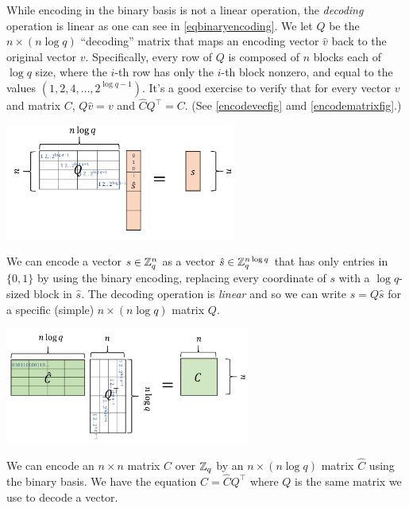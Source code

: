 While encoding in the binary basis is not a linear operation, the
\emph{decoding} operation is linear as one can see in
\eqref{eqbinaryencoding}. We let \(Q\) be the \(n \times (n\log q)\)
``decoding'' matrix that maps an encoding vector \(\hat{v}\) back to the
original vector \(v\). Specifically, every row of \(Q\) is composed of
\(n\) blocks each of \(\log q\) size, where the \(i\)-th row has only
the \(i\)-th block nonzero, and equal to the values
\((1,2,4,\ldots,2^{\log q-1})\). It's a good exercise to verify that for
every vector \(v\) and matrix \(C\), \(Q\hat{v}=v\) and
\(\hat{C}Q^\top =C\). (See \cref{encodevecfig} amd
\cref{encodematrixfig}.)


\begin{marginfigure}
\centering
\includegraphics[width=\linewidth, height=1.5in, keepaspectratio]{../figure/encodevec.png}
\caption{We can encode a vector \(s\in {\mathbb{Z}}_q^n\) as a vector
\(\hat{s} \in {\mathbb{Z}}_q^{n\log q}\) that has only entries in \(\{0,1\}\) by
using the binary encoding, replacing every coordinate of \(s\) with a
\(\log q\)-sized block in \(\hat{s}\). The decoding operation is
\emph{linear} and so we can write \(s=Q\hat{s}\) for a specific (simple)
\(n \times (n\log q)\) matrix \(Q\).}
\label{encodevecfig}
\end{marginfigure}


\begin{marginfigure}
\centering
\includegraphics[width=\linewidth, height=1.5in, keepaspectratio]{../figure/encodematrix.png}
\caption{We can encode an \(n\times n\) matrix \(C\) over \({\mathbb{Z}}_q\) by an
\(n\times (n \log q)\) matrix \(\hat{C}\) using the binary basis. We
have the equation \(C=\hat{C}Q^\top\) where \(Q\) is the same matrix we
use to decode a vector.}
\label{encodematrixfig}
\end{marginfigure}

